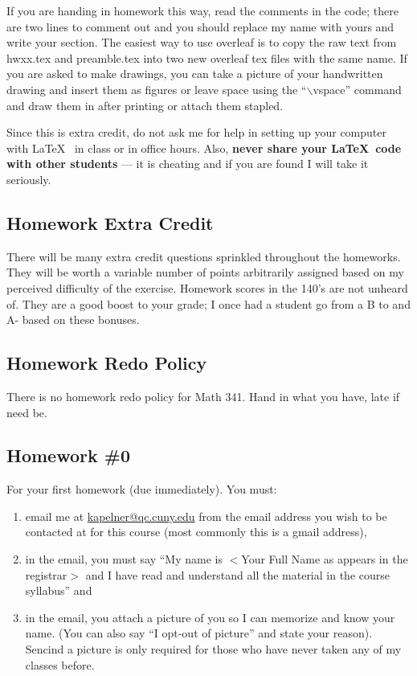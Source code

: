 \documentclass[12pt]{article}
\newcommand{\qu}[1]{``#1''}
\begin{document}
If you are handing in homework this way, read the comments in the code; there are two lines to comment out and you should replace my name with yours and write your section. The easiest way to use overleaf is to copy the raw text from hwxx.tex and preamble.tex into two new overleaf tex files with the same name. If you are asked to make drawings, you can take a picture of your handwritten drawing and insert them as figures or leave space using the \qu{$\backslash$vspace} command and draw them in after printing or attach them stapled.

Since this is extra credit, do not ask me for help in setting up your computer with \LaTeX~ in class or in office hours. Also, \textbf{never share your \LaTeX~code with other students} --- it is cheating and if you are found I will take it seriously.

\subsection*{Homework Extra Credit}

There will be many extra credit questions sprinkled throughout the homeworks. They will be worth a variable number of points arbitrarily assigned based on my perceived difficulty of the exercise. Homework scores in the 140's are not unheard of. They are a good boost to your grade; I once had a student go from a B to and A- based on these bonuses.

\subsection*{Homework Redo Policy}

There is no homework redo policy for Math 341. Hand in what you have, late if need be.

\subsection*{Homework \#0}

For your first homework (due immediately). You must:

\begin{enumerate}[(1)]
\item email me at \href{kapelner@qc.cuny.edu}{kapelner@qc.cuny.edu} from the email address you wish to be contacted at for this course (most commonly this is a gmail address),
\item in the email, you must say \qu{My name is $<$Your Full Name as appears in the registrar$>$ and I have read and understand all the material in the course syllabus} and
\item in the email, you attach a picture of you so I can memorize and know your name. (You can also say \qu{I opt-out of picture} and state your reason). Sencind a picture is only required for those who have never taken any of my classes before. 
\end{enumerate}
\end{document}
